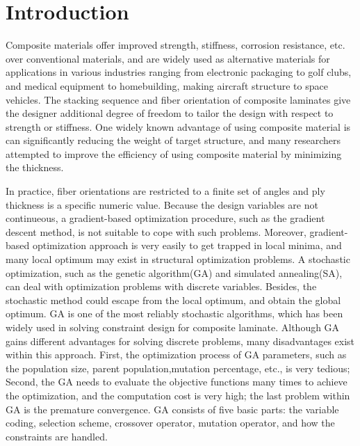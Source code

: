 \section{Introduction}
Composite materials offer improved strength, stiffness, corrosion resistance,
etc. over conventional materials, and are widely used as alternative materials
for applications in various industries ranging from electronic packaging to golf
clubs, and medical equipment to homebuilding, making aircraft structure to space
vehicles. The stacking sequence and fiber orientation of composite laminates
give the designer additional degree of freedom to tailor the design with
respect to strength or stiffness.  One widely known advantage of using composite
material is can significantly reducing the weight of target structure, and many
researchers attempted to improve the efficiency of using composite material by
minimizing the thickness\cite { schmit1973optimum, schmit1977optimum,
	fukunaga1991strength, soares1995discrete, le1995improved,
	jayatheertha1996application, wang1996optimum, adali1997minimum,
	correia1997higher, scares1997optimization, abu1998optimum, lombardi1998anti,
	le1998design, sivakumar1998optimum, barakat1999use, richard2000reliability,
moita2000sensitivity, soremekun2001composite, walker2003technique,
di2003multiconstrained, kere2003using}.

In practice, fiber orientations are restricted to a finite set of angles and
ply thickness is a specific numeric value.  Because the design variables are
not continueous, a gradient-based optimization procedure, such as the gradient
descent method, is not suitable to cope with such problems.  Moreover, gradient-based
optimization approach is very easily to get trapped in local minima, and
many local optimum may exist in structural optimization problems. A stochastic
optimization, such as the genetic algorithm(GA) and simulated annealing(SA), can
deal with optimization problems with discrete variables. Besides, the stochastic
method could escape from the local optimum, and obtain the global optimum.  GA is one of
the most reliably stochastic algorithms, which has been widely used in solving
constraint design for composite
laminate\cite{callahan1992optimum,soremekun2001composite,park2001stacking,walker2003technique,deka2005multiobjective,pelletier2006multi,jadhav2007parametric,kim2007development,park2008improved}.
Although GA gains different advantages for solving discrete problems, many
disadvantages exist within this approach. First, the optimization process of GA
parameters, such as the population size, parent population,mutation percentage,
etc., is very tedious; Second, the GA needs to evaluate the objective functions
many times to achieve the optimization, and the computation cost is very high;
the last problem within GA is the premature convergence. GA consists of five
basic parts: the variable coding, selection scheme, crossover operator, mutation
operator, and how the constraints are handled.

